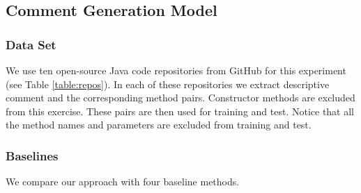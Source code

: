 \subsection{Comment Generation Model}
\subsubsection{Data Set}
We use ten open-source Java code repositories from GitHub for this
experiment (see Table \ref{table:repos}). In each of these repositories
we extract descriptive comment and the corresponding method pairs. Constructor
methods are excluded from this exercise.  These pairs are then used
for training and test. Notice that all the method names and parameters are excluded from
training and test.




\subsubsection{Baselines}
We compare our approach with four baseline methods.

